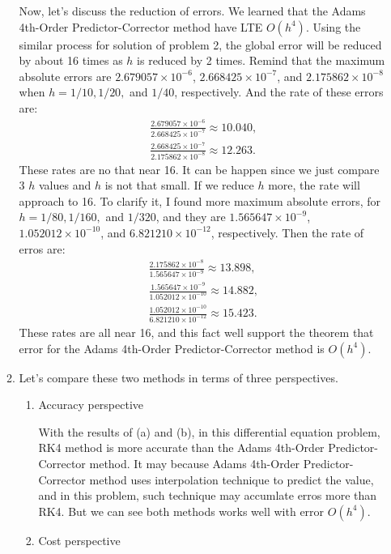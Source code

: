 \documentclass{article}
\begin{document}
\begin{enumerate}
\begin{enumerate}[wide=10pt]
        Now, let's discuss the reduction of errors. We learned that the Adams 4th-Order Predictor-Corrector method have LTE $O(h^4)$. Using the similar process for solution of problem 2, the global error will be reduced by about 16 times as $h$ is reduced by 2 times. Remind that the maximum absolute errors are $2.679057\times 10^{-6}$, $2.668425\times 10^{-7}$, and $2.175862\times 10^{-8}$ when $h=1/10, 1/20,$ and $1/40$, respectively. And the rate of these errors are: \begin{align*}
            \frac{2.679057\times 10^{-6}}{2.668425\times 10^{-7}} \approx 10.040,
            \\ \frac{2.668425\times 10^{-7}}{2.175862\times 10^{-8}} \approx 12.263.
        \end{align*} These rates are no that near 16. It can be happen since we just compare 3 $h$ values and $h$ is not that small. If we reduce $h$ more, the rate will approach to 16. To clarify it, I found more maximum absolute errors, for $h=1/80, 1/160,$ and $1/320$, and they are $1.565647\times 10^{-9}$, $1.052012\times 10^{-10}$, and $6.821210\times 10^{-12}$, respectively. Then the rate of erros are: \begin{align*}
            \frac{2.175862\times 10^{-8}}{1.565647\times 10^{-9}} \approx 13.898,
            \\ \frac{1.565647\times 10^{-9}}{1.052012\times 10^{-10}} \approx 14.882,
            \\ \frac{1.052012\times 10^{-10}}{6.821210\times 10^{-12}} \approx 15.423.
        \end{align*} These rates are all near 16, and this fact well support the theorem that error for the Adams 4th-Order Predictor-Corrector method is $O(h^4)$.
        \item Let’s compare these two methods in terms of three perspectives. \begin{enumerate}[wide=30pt]
            \item Accuracy perspective
            
            With the results of (a) and (b), in this differential equation problem, RK4 method is more accurate than the Adams 4th-Order Predictor-Corrector method. It may because Adams 4th-Order Predictor-Corrector method uses interpolation technique to predict the value, and in this problem, such technique may accumlate erros more  than RK4. But we can see both methods works well with error $O(h^4)$.
            \item Cost perspective
            

\end{enumerate}
\end{enumerate}
\end{enumerate}
\end{document}
